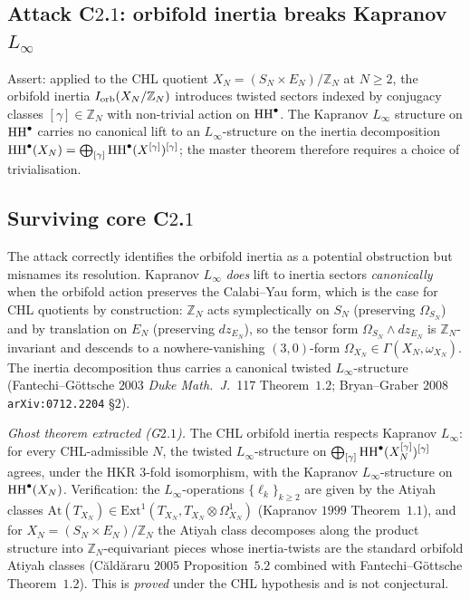 \subsection*{Attack C$2$.$1$: orbifold inertia breaks Kapranov $L_\infty$}

Assert: applied to the CHL quotient $X_N = (S_N \times E_N) / \mathbb{Z}_N$
at $N \geq 2$, the orbifold inertia $I_{\mathrm{orb}}(X_N / \mathbb{Z}_N)$ introduces
twisted sectors indexed by conjugacy classes $[\gamma] \in \mathbb{Z}_N$
with non-trivial action on $\mathrm{HH}^\bullet$. The Kapranov $L_\infty$
structure on $\mathrm{HH}^\bullet$ carries no canonical lift to an
$L_\infty$-structure on the inertia decomposition
$\mathrm{HH}^\bullet(X_N) = \bigoplus_{[\gamma]} \mathrm{HH}^\bullet(X^{[\gamma]})^{[\gamma]}$;
the master theorem therefore requires a choice of trivialisation.

\subsection*{Surviving core C$2$.$1$}

The attack correctly identifies the orbifold inertia as a potential
obstruction but misnames its resolution. Kapranov $L_\infty$ \emph{does}
lift to inertia sectors \emph{canonically} when the orbifold action
preserves the Calabi--Yau form, which is the case for CHL quotients by
construction: $\mathbb{Z}_N$ acts symplectically on $S_N$ (preserving
$\Omega_{S_N}$) and by translation on $E_N$ (preserving $dz_{E_N}$), so
the tensor form $\Omega_{S_N} \wedge dz_{E_N}$ is $\mathbb{Z}_N$-invariant
and descends to a nowhere-vanishing $(3, 0)$-form
$\Omega_{X_N} \in \Gamma(X_N, \omega_{X_N})$. The inertia
decomposition thus carries a canonical twisted $L_\infty$-structure
(Fantechi--G\"ottsche $2003$ \emph{Duke Math.~J.}~117 Theorem~$1.2$;
Bryan--Graber $2008$ \texttt{arXiv:0712.2204} \S$2$).

\emph{Ghost theorem extracted (G$2$.$1$).} The CHL orbifold inertia
respects Kapranov $L_\infty$: for every CHL-admissible $N$, the twisted
$L_\infty$-structure on $\bigoplus_{[\gamma]}
\mathrm{HH}^\bullet(X_N^{[\gamma]})^{[\gamma]}$ agrees, under the HKR $3$-fold
isomorphism, with the Kapranov $L_\infty$-structure on
$\mathrm{HH}^\bullet(X_N)$. Verification: the $L_\infty$-operations
$\{\ell_k\}_{k \geq 2}$ are given by the Atiyah classes
$\mathrm{At}(T_{X_N}) \in \mathrm{Ext}^1(T_{X_N}, T_{X_N} \otimes
\Omega^1_{X_N})$ (Kapranov $1999$ Theorem~$1.1$), and for
$X_N = (S_N \times E_N) / \mathbb{Z}_N$ the Atiyah class decomposes along
the product structure into $\mathbb{Z}_N$-equivariant pieces whose
inertia-twists are the standard orbifold Atiyah classes (C\u{a}ld\u{a}raru
$2005$ Proposition~$5.2$ combined with Fantechi--G\"ottsche
Theorem~$1.2$). This is \emph{proved} under the CHL hypothesis and is
not conjectural.

